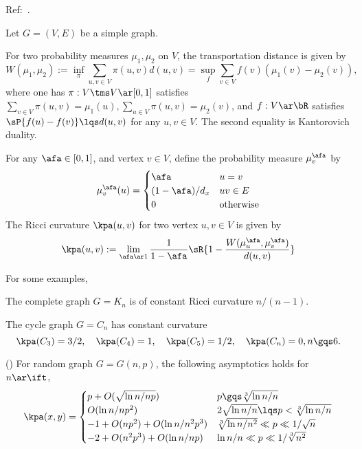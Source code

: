 \documentclass[article, a4paper, twoside]{universal}
\begin{document}

Ref:~\cite{LLY2011}.

\begin{stp}
	Let $G=(V,E)$ be a simple graph.
\end{stp}

\begin{dfn}
	For two probability measures $\mu_{1},\mu_{2}$ on $V$, the transportation distance is given by
	\[
		W(\mu_{1},\mu_{2}):=\inf_{\pi}\sum_{u,v\in V}\pi(u,v)d(u,v)=\sup_{f}\sum_{v\in V}f(v)(\mu_{1}(v)-\mu_{2}(v)),
	\]
	where one has $\pi:V\tms V\ar[0,1]$ satisfies $\sum_{v\in V}\pi(u,v)=\mu_{1}(u),\sum_{u\in V}\pi(u,v)=\mu_{2}(v)$, and $f:V\ar\bR$ satisfies $\sP{f(u)-f(v)}\lqs d(u,v)$ for any $u,v\in V$. The second equality is Kantorovich duality.
\end{dfn}

\begin{dfn}
	For any $\afa\in[0,1]$, and vertex $v\in V$, define the probability measure $\mu_{v}^{\afa}$ by
	\[
		\mu_{v}^{\afa}(u)=\begin{cases}
		  \afa & u=v \\
		  (1-\afa)/d_{x} & uv\in E \\
		  0 & $otherwise$
		\end{cases}
	\]
	The Ricci curvature $\kpa(u,v)$ for two vertex $u,v\in V$ is given by
	\[
		\kpa(u,v):=\lim_{\afa\ar1}\frac{1}{1-\afa}\sR{1-\frac{W(\mu_{u}^{\afa}, \mu_{v}^{\afa})}{d(u,v)}}
	\]
\end{dfn}

\begin{exg}
	For some examples,
	\begin{enr}[label=(\arabic*)]
		\item The complete graph $G=K_{n}$ is of constant Ricci curvature $n/(n-1)$.
		\item The cycle graph $G=C_{n}$ has constant curvature
		\[
			\kpa(C_{3})=3/2,\quad \kpa(C_{4})=1,\quad \kpa(C_{5})=1/2,\quad \kpa(C_{n})=0,n\gqs6.
		\]
		\item (\cite[Theorem~5.1]{LLY2011}) For random graph $G=G(n,p)$, the following asymptotics holds for $n\ar\ift$,
		\[
			\kpa(x,y)=\begin{cases}
			  p+O(\sqrt{\ln{n}/np}) & p\gqs\sqrt[3]{\ln{n}/n} \\
			  O(\ln{n}/np^{2}) & 2\sqrt{\ln{n}/n}\lqs p<\sqrt[3]{\ln{n}/n} \\
			  -1+O(np^{2})+O(\ln{n}/n^{2}p^{3}) & \sqrt[3]{\ln{n}/n^{2}}\ll p\ll 1/\sqrt{n} \\
			  -2+O(n^{2}p^{3})+O(\ln{n}/np) & \ln{n}/n\ll p\ll 1/\sqrt[3]{n^{2}}
			\end{cases}
		\]
	\end{enr}
\end{exg}


\printref
\end{document}
